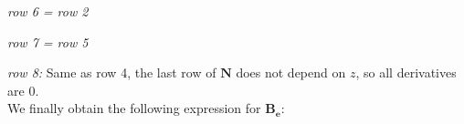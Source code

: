\documentclass[a4paper,11pt]{article}
\newcommand{\bN}{\mathbf{N}}
\newcommand{\Be}{\mathbf{B_e}}
\newcommand{\gr}{\textbf}
\begin{document}
\noindent \textit{row 6 = row 2}

\noindent \textit{row 7 = row 5}

\noindent \textit{row 8:} Same as row 4, the last row of $\bN$ does not depend on $z$, so all derivatives are $0$.\\

\noindent We finally obtain the following expression for $\Be$:
\end{document}
